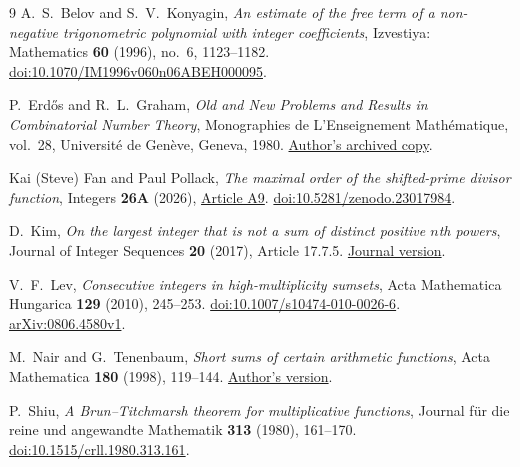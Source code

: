 \documentclass[11pt]{amsart}
\numberwithin{equation}{section}
\theoremstyle{remark}
\begin{document}
\begin{thebibliography}{9}
A.~S.~Belov and S.~V.~Konyagin,
\emph{An estimate of the free term of a non-negative trigonometric
polynomial with integer coefficients},
Izvestiya: Mathematics \textbf{60} (1996), no.~6, 1123--1182.
\href{https://doi.org/10.1070/IM1996v060n06ABEH000095}
{doi:10.1070/IM1996v060n06ABEH000095}.

P.~Erd\H{o}s and R.~L.~Graham,
\emph{Old and New Problems and Results in Combinatorial Number Theory},
Monographies de L'Enseignement Math\'ematique, vol.~28,
Universit\'e de Gen\`eve, Geneva, 1980.
\href{https://fanchung.ucsd.edu/ron/papers/80_11_number_theory.pdf}{Author's archived copy}.

Kai (Steve) Fan and Paul Pollack,
\emph{The maximal order of the shifted-prime divisor function},
Integers \textbf{26A} (2026),
\href{https://math.colgate.edu/~integers/aap9/aap9.pdf}{Article A9}.
\href{https://doi.org/10.5281/zenodo.23017984}{doi:10.5281/zenodo.23017984}.

D.~Kim,
\emph{On the largest integer that is not a sum of distinct positive
\(n\)th powers},
Journal of Integer Sequences \textbf{20} (2017), Article 17.7.5.
\href{https://cs.uwaterloo.ca/journals/JIS/VOL20/Kim/kim6.pdf}{Journal version}.

V.~F.~Lev,
\emph{Consecutive integers in high-multiplicity sumsets},
Acta Mathematica Hungarica \textbf{129} (2010), 245--253.
\href{https://doi.org/10.1007/s10474-010-0026-6}{doi:10.1007/s10474-010-0026-6}.
\href{https://arxiv.org/abs/0806.4580v1}{arXiv:0806.4580v1}.

M.~Nair and G.~Tenenbaum,
\emph{Short sums of certain arithmetic functions},
Acta Mathematica \textbf{180} (1998), 119--144.
\href{https://tenenb.perso.math.cnrs.fr/PPP/ShortSums.pdf}{Author's version}.

P.~Shiu,
\emph{A Brun--Titchmarsh theorem for multiplicative functions},
Journal f\"ur die reine und angewandte Mathematik \textbf{313} (1980), 161--170.
\href{https://doi.org/10.1515/crll.1980.313.161}{doi:10.1515/crll.1980.313.161}.

\end{thebibliography}
\end{document}
